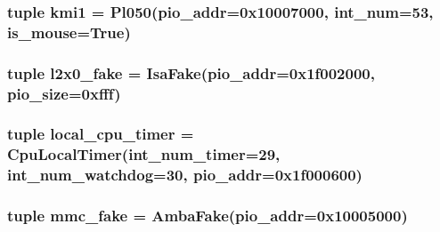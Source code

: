 \label{classRealView_1_1RealViewPBX_a4fcef88eafab200d46609dff412add24}
\hypertarget{classRealView_1_1RealViewPBX_ad2ff68a98564bfc794ffe30ecd80da6c}{
\subsubsection[{kmi1}]{\setlength{\rightskip}{0pt plus 5cm}tuple {\bf kmi1} = {\bf Pl050}(pio\_\-addr=0x10007000, int\_\-num=53, is\_\-mouse=True)}}
\label{classRealView_1_1RealViewPBX_ad2ff68a98564bfc794ffe30ecd80da6c}
\hypertarget{classRealView_1_1RealViewPBX_a58c42fcf23ff778110e667e2df1fbb6f}{
\subsubsection[{l2x0\_\-fake}]{\setlength{\rightskip}{0pt plus 5cm}tuple {\bf l2x0\_\-fake} = {\bf IsaFake}(pio\_\-addr=0x1f002000, pio\_\-size=0xfff)}}
\label{classRealView_1_1RealViewPBX_a58c42fcf23ff778110e667e2df1fbb6f}
\hypertarget{classRealView_1_1RealViewPBX_a4fac58dbb9d72c639bc0d5836e2e1252}{
\subsubsection[{local\_\-cpu\_\-timer}]{\setlength{\rightskip}{0pt plus 5cm}tuple {\bf local\_\-cpu\_\-timer} = {\bf CpuLocalTimer}(int\_\-num\_\-timer=29, int\_\-num\_\-watchdog=30, pio\_\-addr=0x1f000600)}}
\label{classRealView_1_1RealViewPBX_a4fac58dbb9d72c639bc0d5836e2e1252}
\hypertarget{classRealView_1_1RealViewPBX_aea1f4d5125bc4930882b7415e32696dc}{
\subsubsection[{mmc\_\-fake}]{\setlength{\rightskip}{0pt plus 5cm}tuple {\bf mmc\_\-fake} = {\bf AmbaFake}(pio\_\-addr=0x10005000)}}

